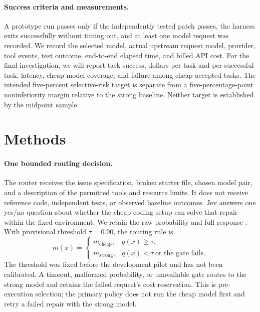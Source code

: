 \documentclass{article}
\begin{document}
\paragraph{Success criteria and measurements.}
A prototype run passes only if the independently tested patch passes, the harness exits successfully without timing out, and at least one model request was recorded. We record the selected model, actual upstream request model, provider, tool events, test outcome, end-to-end elapsed time, and billed API cost. For the final investigation, we will report task success, dollars per task and per successful task, latency, cheap-model coverage, and failure among cheap-accepted tasks. The intended five-percent selective-risk target is separate from a five-percentage-point noninferiority margin relative to the strong baseline. Neither target is established by the midpoint sample.

\section{Methods}

\paragraph{One bounded routing decision.}
The router receives the issue specification, broken starter file, chosen model pair, and a description of the permitted tools and resource limits. It does not receive reference code, independent tests, or observed baseline outcomes. Jev answers one yes/no question about whether the cheap coding setup can solve that repair within the fixed environment. We retain the raw probability and full response \citep{openrouter2026,typesafe2026}. With provisional threshold $\tau=0.90$, the routing rule is
\[
m(x)=\begin{cases}
m_{\mathrm{cheap}}, & q(x)\geq\tau,\\
m_{\mathrm{strong}}, & q(x)<\tau\ \text{or the gate fails}.
\end{cases}
\]
The threshold was fixed before the development pilot and has not been calibrated. A timeout, malformed probability, or unavailable gate routes to the strong model and retains the failed request's cost reservation. This is pre-execution selection; the primary policy does not run the cheap model first and retry a failed repair with the strong model.
\end{document}
